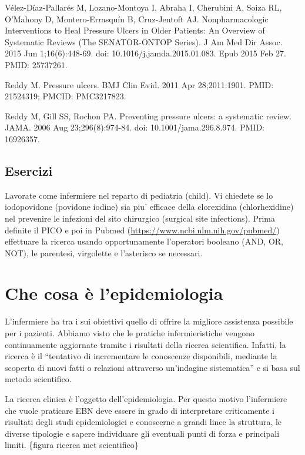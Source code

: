 \documentclass[]{book}
\begin{document}
Vélez-Díaz-Pallarés M, Lozano-Montoya I, Abraha I, Cherubini A, Soiza RL, O'Mahony D, Montero-Errasquín B, Cruz-Jentoft AJ. Nonpharmacologic Interventions to Heal Pressure Ulcers in Older Patients: An Overview of Systematic Reviews (The SENATOR-ONTOP Series). J Am Med Dir Assoc. 2015 Jun 1;16(6):448-69. doi: 10.1016/j.jamda.2015.01.083. Epub 2015 Feb 27. PMID: 25737261.

Reddy M. Pressure ulcers. BMJ Clin Evid. 2011 Apr 28;2011:1901. PMID: 21524319; PMCID: PMC3217823.

Reddy M, Gill SS, Rochon PA. Preventing pressure ulcers: a systematic review. JAMA. 2006 Aug 23;296(8):974-84. doi: 10.1001/jama.296.8.974. PMID: 16926357.

\hypertarget{esercizi}{%
\subsection{Esercizi}\label{esercizi}}

Lavorate come infermiere nel reparto di pediatria (child). Vi chiedete se lo iodopovidone (povidone iodine) sia piu' efficace della clorexidina (chlorhexidine) nel prevenire le infezioni del sito chirurgico (surgical site infections).
Prima definite il PICO e poi in Pubmed (\url{https://www.ncbi.nlm.nih.gov/pubmed/}) effettuare la ricerca usando opportunamente l'operatori booleano (AND, OR, NOT), le parentesi, virgolette e l'asterisco se necessari.

\hypertarget{che-cosa-uxe8-lepidemiologia}{%
\section{Che cosa è l'epidemiologia}\label{che-cosa-uxe8-lepidemiologia}}

L'infermiere ha tra i sui obiettivi quello di offrire la migliore assistenza possibile per i pazienti. Abbiamo visto che le pratiche infermieristiche vengono continuamente aggiornate tramite i risultati della ricerca scientifica. Infatti, la ricerca è il ``tentativo di incrementare le conoscenze disponibili, mediante la scoperta di nuovi fatti o relazioni attraverso un'indagine sistematica'' e si basa sul metodo scientifico.

La ricerca clinica è l'oggetto dell'epidemiologia. Per questo motivo l'infermiere che vuole praticare EBN deve essere in grado di interpretare criticamente i risultati degli studi epidemiologici e conoscerne a grandi linee la struttura, le diverse tipologie e sapere individuare gli eventuali punti di forza e principali limiti.
\{figura ricerca met scientifico\}
\end{document}
